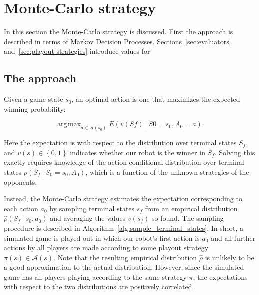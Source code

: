 \documentclass{article}
\newcommand{\Action}{A}
\newcommand{\action}{a}
\newcommand{\actions}{\mathcal{A}}
\newcommand{\randomState}{S}
\newcommand{\state}{s}
\newcommand{\evaluator}{v}
\newcommand{\probability}{\rho}
\newcommand{\expectation}[2]{E\left({#1\given#2}\right)}
\newcommand{\given}[1][]{\:#1\vert\:}
\DeclareMathOperator*{\argmax}{\arg\!\max}
\newcommand{\initial}{0}
\newcommand{\final}{f}
\begin{document}
\section{Monte-Carlo strategy}

In this section the Monte-Carlo strategy is discussed.  First the approach is described in terms of Markov Decision Processes.  Sections~\ref{sec:evaluators} and~\ref{sec:playout-strategies} introduce values for 

\subsection{The approach}

Given a game state $\state_\initial$, an optimal action is one that maximizes the expected winning probability:

\[
\argmax_{\action \in \actions\left(\state_\initial\right)} \expectation{\evaluator\left(\randomState\final\right)}{\randomState\initial=\state_\initial, \Action_\initial=\action}.
\]

Here the expectation is with respect to the distribution over terminal states $\randomState_\final$, and $\evaluator\left(\state\right) \in \left\{0,1\right\}$ indicates whether our robot is the winner in $\randomState_\final$.  Solving this exactly requires knowledge of the action-conditional distribution over terminal states $\probability\left(\randomState_\final \given \randomState_\initial=\state_\initial, \Action_\initial\right)$, which is a function of the unknown strategies of the opponents.

Instead, the Monte-Carlo strategy estimates the expectation corresponding to each action $\action_\initial$ by sampling terminal states $\state_\final$ from an empirical distribution $\hat{\probability}\left(\randomState_\final \given \state_\initial,\action_\initial\right)$ and averaging the values $\evaluator\left(\state_\final\right)$ so found.  The sampling procedure is described in Algorithm~\ref{alg:sample_terminal_states}.  In short, a simulated game is played out in which our robot's first action is $\action_\initial$ and all further actions by all players are made according to some playout strategy $\pi\left(\state\right) \in \actions\left(\state\right)$.  Note that the resulting empirical distribution $\hat{\probability}$ is unlikely to be a good approximation to the actual distribution.  However, since the simulated game has all players playing according to the same strategy $\pi$, the expectations with respect to the two distributions are positively correlated.
\end{document}
